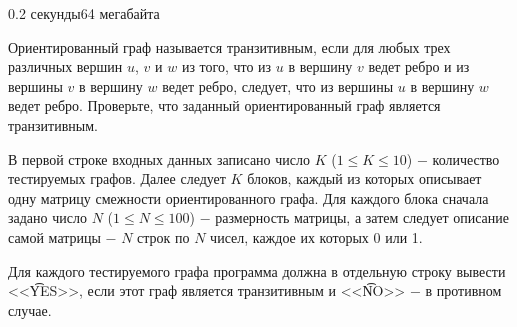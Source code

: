 \begin{problem}{}{}{}{0.2 секунды}{64 мегабайта}

Ориентированный граф называется транзитивным, если для любых трех различных вершин $u$, $v$ и $w$ из того, что из $u$ 
в вершину $v$ ведет ребро и из вершины $v$ в вершину $w$ ведет ребро, следует, что из вершины $u$ в вершину $w$ ведет ребро.
Проверьте, что заданный ориентированный граф является транзитивным.

\InputFile
В первой строке входных данных записано число $K$ ($1 \le K \le 10$) $-$ количество тестируемых графов. Далее следует $K$
блоков, каждый из которых описывает одну матрицу смежности ориентированного графа. 
Для каждого блока сначала задано число $N$ ($1 \le N \le 100$) $-$ 
размерность матрицы, а затем следует описание самой матрицы $-$ $N$ строк по $N$ чисел, каждое их которых 0 или 1.

\OutputFile
Для каждого тестируемого графа программа должна в отдельную строку вывести <<{\t{YES}}>>, если этот граф
является транзитивным и <<{\t{NO}}>> $-$ в противном случае.

\Example

\begin{example}
%
\end{example}

\end{problem}

